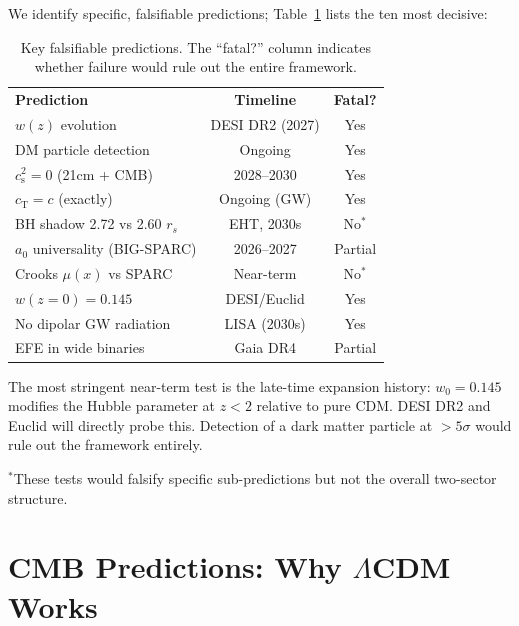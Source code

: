 \documentclass[prd,twocolumn,superscriptaddress,longbibliography,floatfix]{revtex4-2}
\newcommand{\cs}{c_{\mathrm{s}}}
\newcommand{\cT}{c_{\mathrm{T}}}
\begin{document}
We identify specific, falsifiable predictions;
Table~\ref{tab:falsify} lists the ten most decisive:

\begin{table}[t]
\caption{\label{tab:falsify}Key falsifiable predictions.
The ``fatal?'' column indicates whether failure would
rule out the entire framework.}
\begin{ruledtabular}
\begin{tabular}{lcc}
\textbf{Prediction} & \textbf{Timeline} & \textbf{Fatal?} \\
\colrule
$w(z)$ evolution & DESI DR2 (2027) & Yes \\
DM particle detection & Ongoing & Yes \\
$\cs^2 = 0$ (21cm + CMB) & 2028--2030 & Yes \\
$\cT = c$ (exactly) & Ongoing (GW) & Yes \\
BH shadow 2.72 vs 2.60 $r_s$ & EHT, 2030s & No$^*$ \\
$a_0$ universality (BIG-SPARC) & 2026--2027 & Partial \\
Crooks $\mu(x)$ vs SPARC & Near-term & No$^*$ \\
$w(z{=}0) = 0.145$ & DESI/Euclid & Yes \\
No dipolar GW radiation & LISA (2030s) & Yes \\
EFE in wide binaries & Gaia DR4 & Partial \\
\end{tabular}
\end{ruledtabular}
\end{table}

The most stringent near-term test is the late-time
expansion history: $w_0 = 0.145$ modifies the
Hubble parameter at $z < 2$ relative to pure CDM.
DESI DR2 and Euclid will directly probe this.  Detection of a dark matter
particle at $> 5\sigma$ would rule out the framework entirely.

$^*$These tests would falsify specific sub-predictions but
not the overall two-sector structure.


\section{CMB Predictions: Why \texorpdfstring{$\Lambda$CDM}{LCDM} Works}
\label{sec:cmb}

\end{document}
